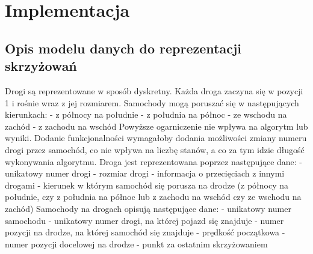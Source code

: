 \chapter{Implementacja} \label{chap:implementation}

\section{Opis modelu danych do reprezentacji skrzyżowań}

Drogi są reprezentowane w sposób dyskretny. Każda droga zaczyna się w pozycji 1 i rośnie wraz z jej rozmiarem. 
\newline
\newline
Samochody mogą poruszać się w następujących kierunkach:
\newline
- z północy na południe
\newline
- z południa na północ
\newline
- ze wschodu na zachód
\newline
- z zachodu na wschód
\newline
\newline
Powyższe ogarniczenie nie wpływa na algorytm lub wyniki. Dodanie funkcjonalności wymagałoby dodania możliwości zmiany numeru drogi przez samochód, co nie wpływa na liczbę stanów, a co za tym idzie długość wykonywania algorytmu.
\newline
\newline
Droga jest reprezentowana poprzez następujące dane:
\newline
- unikatowy numer drogi
\newline
- rozmiar drogi
\newline
- informacja o przecięciach z innymi drogami
\newline
- kierunek w którym samochód się porusza na drodze (z północy na południe, czy z południa na północ lub z zachodu na wschód czy ze wschodu na zachód)
\newline
\newline
Samochody na drogach opisują następujące dane:
\newline
- unikatowy numer samochodu
\newline
- unikatowy numer drogi, na której pojazd się znajduje
\newline
- numer pozycji na drodze, na której samochód się znajduje
\newline
- prędkość początkowa
\newline
- numer pozycji docelowej na drodze - punkt za ostatnim skrzyżowaniem
\newline
